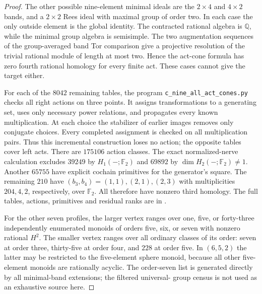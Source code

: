 \begin{proof}
The other possible nine-element minimal ideals are the
$2\times4$ and $4\times2$ bands, and a $2\times2$ Rees ideal
with maximal group of order two. In each case the only outside
element is the global identity. The contracted rational algebra
is $\mathbb Q$, while the minimal group algebra is semisimple.
The two augmentation sequences of the group-averaged band Tor
comparison give a projective resolution of the trivial rational
module of length at most two. Hence the act-cone formula has
zero fourth rational homology for every finite act. These cases
cannot give the target either.

For each of the $8042$ remaining tables, the program
\texttt{c\_nine\_all\_act\_cones.py} checks all right actions
on three points. It assigns transformations to a generating set,
uses only necessary power relations, and propagates every known
multiplication. At each choice the stabilizer of earlier images
removes only conjugate choices. Every completed assignment is
checked on all multiplication pairs. Thus this incremental
construction loses no action; the opposite tables cover left acts.
There are $175106$ action classes. The exact normalized-nerve
calculation excludes $39249$ by $H_1(-;\mathbb F_2)$ and
$69892$ by $\dim H_2(-;\mathbb F_2)\ne1$. Another $65755$
have explicit cochain primitives for the generator's square.
The remaining $210$ have $(b_3,b_4)=(1,1),(2,1),(2,3)$ with
multiplicities $204,4,2$, respectively, over $\mathbb F_2$.
All therefore have nonzero third homology. The full tables,
actions, primitives and residual ranks are in
.

For the other seven profiles, the larger vertex ranges over
one, five, or forty-three independently enumerated monoids of
orders five, six, or seven with nonzero rational $H^2$.
The smaller vertex ranges over all ordinary classes of its order:
seven at order three, thirty-five at order four, and $228$ at
order five. In $(6,5,2)$ the latter may be restricted to the
five-element sphere monoid, because all other five-element
monoids are rationally acyclic. The order-seven list is generated
directly by all minimal-band extensions; the filtered universal-
group census is not used as an exhaustive source here.


\end{proof}
